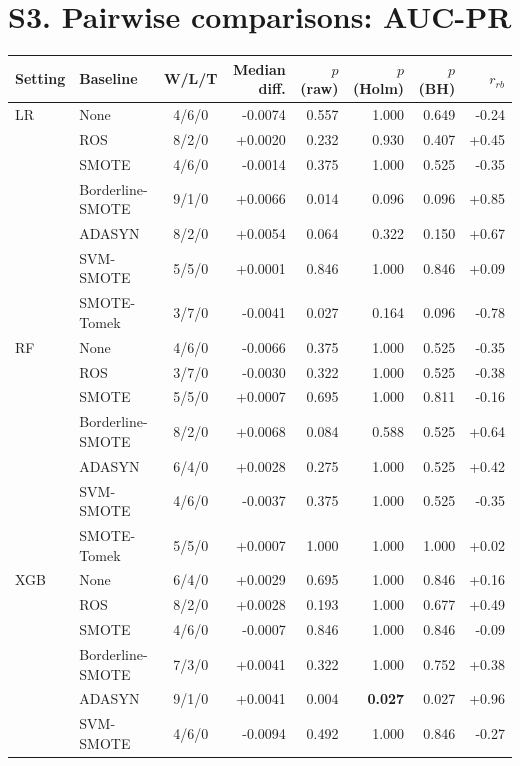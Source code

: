 \documentclass[10pt,a4paper]{article}
\begin{document}
\section*{S3. Pairwise comparisons: AUC-PR}
\begin{center}\footnotesize\begin{longtable}{@{}llcrrrrr@{}}\toprule Setting & Baseline & W/L/T & Median diff. & $p$ (raw) & $p$ (Holm) & $p$ (BH) & $r_{rb}$ \\ \midrule\endhead
LR & None & 4/6/0 & -0.0074 & 0.557 & 1.000 & 0.649 & -0.24 \\
 & ROS & 8/2/0 & +0.0020 & 0.232 & 0.930 & 0.407 & +0.45 \\
 & SMOTE & 4/6/0 & -0.0014 & 0.375 & 1.000 & 0.525 & -0.35 \\
 & Borderline-SMOTE & 9/1/0 & +0.0066 & 0.014 & 0.096 & 0.096 & +0.85 \\
 & ADASYN & 8/2/0 & +0.0054 & 0.064 & 0.322 & 0.150 & +0.67 \\
 & SVM-SMOTE & 5/5/0 & +0.0001 & 0.846 & 1.000 & 0.846 & +0.09 \\
 & SMOTE-Tomek & 3/7/0 & -0.0041 & 0.027 & 0.164 & 0.096 & -0.78 \\
\midrule
RF & None & 4/6/0 & -0.0066 & 0.375 & 1.000 & 0.525 & -0.35 \\
 & ROS & 3/7/0 & -0.0030 & 0.322 & 1.000 & 0.525 & -0.38 \\
 & SMOTE & 5/5/0 & +0.0007 & 0.695 & 1.000 & 0.811 & -0.16 \\
 & Borderline-SMOTE & 8/2/0 & +0.0068 & 0.084 & 0.588 & 0.525 & +0.64 \\
 & ADASYN & 6/4/0 & +0.0028 & 0.275 & 1.000 & 0.525 & +0.42 \\
 & SVM-SMOTE & 4/6/0 & -0.0037 & 0.375 & 1.000 & 0.525 & -0.35 \\
 & SMOTE-Tomek & 5/5/0 & +0.0007 & 1.000 & 1.000 & 1.000 & +0.02 \\
\midrule
XGB & None & 6/4/0 & +0.0029 & 0.695 & 1.000 & 0.846 & +0.16 \\
 & ROS & 8/2/0 & +0.0028 & 0.193 & 1.000 & 0.677 & +0.49 \\
 & SMOTE & 4/6/0 & -0.0007 & 0.846 & 1.000 & 0.846 & -0.09 \\
 & Borderline-SMOTE & 7/3/0 & +0.0041 & 0.322 & 1.000 & 0.752 & +0.38 \\
 & ADASYN & 9/1/0 & +0.0041 & 0.004 & \textbf{0.027} & 0.027 & +0.96 \\
 & SVM-SMOTE & 4/6/0 & -0.0094 & 0.492 & 1.000 & 0.846 & -0.27 \\

\end{longtable}
\end{center}
\end{document}
